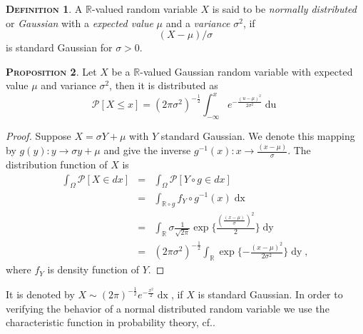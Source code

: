 \documentclass[a4paper, twoside, 11pt]{article}
\theoremstyle{definition}
\newtheorem{definition}{\scshape Definition}[section]
\newtheorem{proposition}[definition]{\scshape Proposition}
\begin{document}
\begin{definition}
  A $\mathbb{R}$-valued random variable $X$ is said to be \emph{normally distributed} or \emph{Gaussian} with a \emph{expected value} $\mu$ and a \emph{variance} $\sigma^2$, if
\[
  (X-\mu) / \sigma
\]
is standard Gaussian for $\sigma>0$.
\end{definition}

\begin{proposition}
  Let $X$ be a $\mathbb{R}$-valued Gaussian random variable with expected value $\mu$ and variance $\sigma^2$, then it is distributed as
  \begin{equation*}
	\mathcal{P}[X\le x] = (2\pi\sigma^2)^{-\frac{1}{2}}\int_{-\infty}^x e^{-\frac{(u-\mu)^2}{2\sigma^2}}\mathop{du}
  \end{equation*}
\end{proposition}

\begin{proof}
  Suppose $X = \sigma Y + \mu$ with $Y$ standard Gaussian. We denote this mapping by $g(y) : y \rightarrow \sigma y + \mu$ and give the inverse $g^{-1}(x) : x \rightarrow \frac{(x-\mu)}{\sigma}$. The distribution function of $X$ is 
  \begin{eqnarray*}
	\int_\Omega \mathcal{P}[X \in dx] &=& \int_\Omega \mathcal{P}[Y \circ g \in dx] \\
	&=& \int_{\mathbb{R}\circ g} f_Y \circ g^{-1}(x) \mathop{dx}\\
	&=& \int_{\mathbb{R}} \sigma \frac{1}{\sqrt{2\pi}} \exp\{\frac{(\frac{(x-\mu)}{\sigma})^2}{2}\} \mathop{dy}\\
	&=&  (2\pi\sigma^2)^{-\frac{1}{2}}\int_{\mathbb{R}} \exp\{-\frac{(x-\mu)^2}{2\sigma^2}\}\mathop{dy} ,
  \end{eqnarray*}
 where $f_Y$ is density function of $Y$.
\end{proof}

It is denoted by $X \sim (2\pi)^{-\frac{1}{2}}e^{-\frac{x^2}{2}}\mathop{dx} $, if $X$ is standard Gaussian. In order to verifying the behavior of a normal distributed random variable we use the characteristic function in probability theory, cf.\cite{bauer}. 
\end{document}
